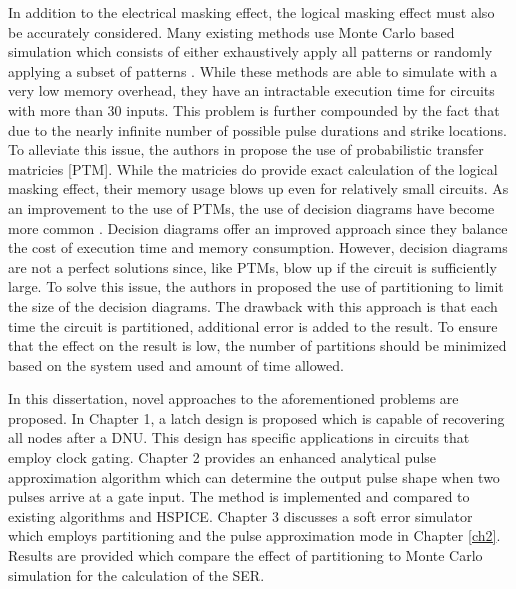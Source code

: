 In addition to the electrical masking effect, the logical masking effect must also be accurately considered. Many existing methods use Monte Carlo based simulation which consists of either exhaustively apply all patterns or randomly applying a subset of patterns \cite{Accurate_Masking,PARAM_DESC,SEMM,SERA,SETA_LA}. While these methods are able to simulate with a very low memory overhead, they have an intractable execution time for circuits with more than 30 inputs. This problem is further compounded by the fact that due to the nearly infinite number of possible pulse durations and strike locations. To alleviate this issue, the authors in \cite{PTM} propose the use of probabilistic transfer matricies [PTM]. While the matricies do provide exact calculation of the logical masking effect, their memory usage blows up even for relatively small circuits. As an improvement to the use of PTMs, the use of decision diagrams have become more common \cite{FASER,MARS_C}. Decision diagrams offer an improved approach since they balance the cost of execution time and memory consumption. However, decision diagrams are not a perfect solutions since, like PTMs, blow up if the circuit is sufficiently large. To solve this issue, the authors in \cite{FASER} proposed the use of partitioning to limit the size of the decision diagrams. The drawback with this approach is that each time the circuit is partitioned, additional error is added to the result. To ensure that the effect on the result is low, the number of partitions should be minimized based on the system used and amount of time allowed. 

In this dissertation, novel approaches to the aforementioned problems are proposed. In Chapter 1, a latch design is proposed which is capable of recovering all nodes after a DNU. This design has specific applications in circuits that employ clock gating. Chapter 2 provides an enhanced analytical pulse approximation algorithm which can determine the output pulse shape when two pulses arrive at a gate input. The method is implemented and compared to existing algorithms and HSPICE. Chapter 3 discusses a soft error simulator which employs partitioning and the pulse approximation mode in Chapter \ref{ch2}. Results are provided which compare the effect of partitioning to Monte Carlo simulation for the calculation of the SER.